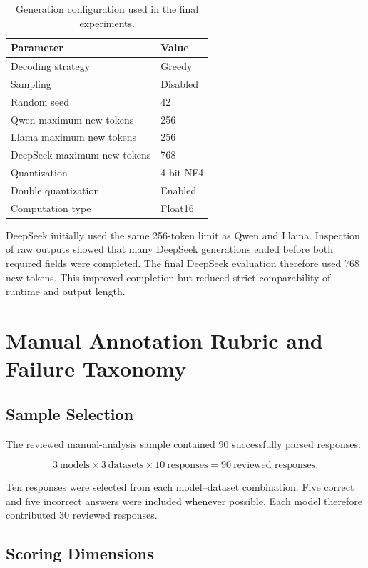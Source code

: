 \begin{table}[t]
\centering
\small
\caption{Generation configuration used in the final experiments.}
\label{tab:appendix_generation}
\begin{tabular}{ll}
\toprule
\textbf{Parameter} & \textbf{Value} \\
\midrule
Decoding strategy & Greedy \\
Sampling & Disabled \\
Random seed & 42 \\
Qwen maximum new tokens & 256 \\
Llama maximum new tokens & 256 \\
DeepSeek maximum new tokens & 768 \\
Quantization & 4-bit NF4 \\
Double quantization & Enabled \\
Computation type & Float16 \\
\bottomrule
\end{tabular}
\end{table}

DeepSeek initially used the same 256-token limit as Qwen and Llama. Inspection
of raw outputs showed that many DeepSeek generations ended before both required
fields were completed. The final DeepSeek evaluation therefore used 768 new
tokens. This improved completion but reduced strict comparability of runtime
and output length.

\section{Manual Annotation Rubric and Failure Taxonomy}
\label{app:annotation}

\subsection{Sample Selection}

The reviewed manual-analysis sample contained 90 successfully parsed
responses:

\[
3\ \text{models}
\times
3\ \text{datasets}
\times
10\ \text{responses}
=
90\ \text{reviewed responses}.
\]

Ten responses were selected from each model--dataset combination. Five correct
and five incorrect answers were included whenever possible. Each model
therefore contributed 30 reviewed responses.

\subsection{Scoring Dimensions}

